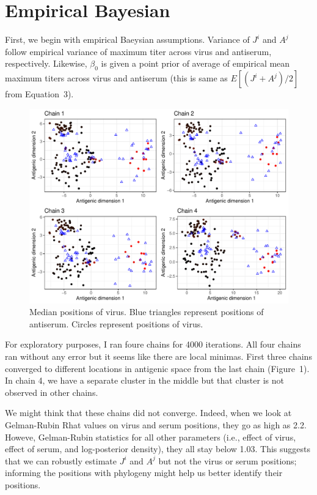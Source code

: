 \documentclass[12pt]{article}
\begin{document}
\section{Empirical Bayesian}

First, we begin with empirical Baeysian assumptions.
Variance of $J^i$ and $A^j$ follow empirical variance of maximum titer across virus and antiserum, respectively.
Likewise, $\beta_0$ is given a point prior of average of empirical mean maximum titers across virus and antiserum (this is same as $E[(J^i + A^j)/2]$ from Equation~3).

\begin{figure}
\includegraphics[width=\textwidth]{../figure/h1n1_map.pdf}
\caption{Median positions of virus. 
Blue triangles represent positions of antiserum.
Circles represent positions of virus.
}
\end{figure}

For exploratory purposes, I ran foure chains for 4000 iterations.
All four chains ran without any error but it seems like there are local minimas.
First three chains converged to different locations in antigenic space from the last chain (Figure~1). 
In chain 4, we have a separate cluster in the middle but that cluster is not observed in other chains. 

We might think that these chains did not converge. 
Indeed, when we look at Gelman-Rubin Rhat values on virus and serum positions, they go as high as 2.2.
Howeve, Gelman-Rubin statistics for all other parameters (i.e., effect of virus, effect of serum, and log-posterior density), they all stay below 1.03. 
This suggests that we can robustly estimate $J^i$ and $A^j$ but not the virus or serum positions;
informing the positions with phylogeny might help us better identify their positions.
\end{document}

